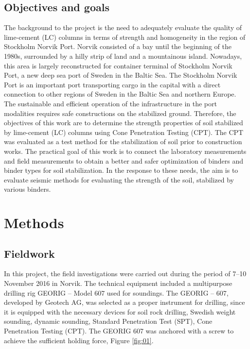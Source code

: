 \documentclass[final,3p,times,onecolumn,authoryear]{elsarticle}
\begin{document}
\subsection{Objectives and goals}
The background to the project is the need to adequately evaluate the quality of lime-cement (LC) columns in terms of strength and homogeneity in the region of Stockholm Norvik Port. Norvik consisted of a bay until the beginning of the 1980s, surrounded by a hilly strip of land and a mountainous island. Nowadays, this area is largely reconstructed for container terminal of Stockholm Norvik Port, a new deep sea port of Sweden in the Baltic Sea. The Stockholm Norvik Port is an important port transporting cargo in the capital with a direct connection to other regions of Sweden in the Baltic Sea and northern Europe. The sustainable and efficient operation of the infrastructure in the port modalities requires safe constructions on the stabilized ground. Therefore, the objectives of this work are to determine the strength properties of soil stabilized by lime-cement (LC) columns using Cone Penetration Testing (CPT). The CPT was evaluated as a test method for the stabilization of soil prior to construction works. The practical goal of this work is to connect the laboratory measurements and field measurements to obtain a better and safer optimization of binders and binder types for soil stabilization. In the response to these needs, the aim is to evaluate seismic methods for evaluating the strength of the soil, stabilized by various binders. 

\section{Methods}

\subsection{Fieldwork}
In this project, the field investigations were carried out during the period of 7--10 November 2016 in Norvik. The technical equipment included a multipurpose drilling rig GEORIG -- Model 607 used for soundings. The GEORIG -- 607, developed by Geotech AG, was selected as a proper instrument for drilling, since it is equipped with the necessary devices for soil rock drilling, Swedish weight sounding, dynamic sounding, Standard Penetration Test (SPT), Cone Penetration Testing (CPT). The GEORIG 607 was anchored with a screw to achieve the sufficient holding force, Figure \ref{fig:01}. 
\end{document}
